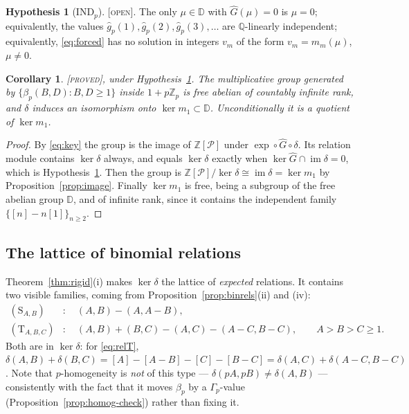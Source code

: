 \documentclass[11pt,reqno]{article}
\newcommand{\Zp}{\mathbb{Z}_p}
\newcommand{\QQ}{\mathbb{Q}}
\newcommand{\ZZ}{\mathbb{Z}}
\newcommand{\Gp}{\Gamma_p}
\newcommand{\gh}{\widehat{g}_p}
\newcommand{\bet}{\beta_p}
\newcommand{\Pset}{\mathcal{P}}
\newcommand{\Div}{\mathbb{D}}
\DeclareMathOperator{\im}{im}
\newcommand{\PROVED}{{\normalfont\textsc{[proved]}}}
\newcommand{\OPENTAG}{{\normalfont\textsc{[open]}}}
\theoremstyle{plain}
\newtheorem{corollary}[theorem]{Corollary}
\theoremstyle{definition}
\newtheorem{hypothesis}[theorem]{Hypothesis}
\theoremstyle{remark}
\numberwithin{equation}{section}
\begin{document}
\begin{hypothesis}[$\mathrm{IND}_p$]\label{hyp:ind}
\OPENTAG.  The only $\mu\in\Div$ with $\widehat G(\mu)=0$ is $\mu=0$;
equivalently, the values $\gh(1),\gh(2),\gh(3),\dots$ are $\QQ$-linearly
independent; equivalently, \eqref{eq:forced} has no solution in integers $v_m$
of the form $v_m=m_m(\mu)$, $\mu\ne0$.
\end{hypothesis}

\begin{corollary}\label{cor:free}
\PROVED, under Hypothesis~\ref{hyp:ind}.  The multiplicative group generated by
$\{\bet(B,D):B,D\ge1\}$ inside $1+p\Zp$ is free abelian of countably infinite
rank, and $\delta$ induces an isomorphism onto $\ker m_1\subset\Div$.
Unconditionally it is a quotient of $\ker m_1$.
\end{corollary}

\begin{proof}
By \eqref{eq:key} the group is the image of $\ZZ[\Pset]$ under
$\exp\circ\widehat G\circ\delta$.  Its relation module contains $\ker\delta$
always, and equals $\ker\delta$ exactly when $\ker\widehat G\cap\im\delta=0$,
which is Hypothesis~\ref{hyp:ind}.  Then the group is
$\ZZ[\Pset]/\ker\delta\cong\im\delta=\ker m_1$ by
Proposition~\ref{prop:image}.  Finally $\ker m_1$ is free, being a subgroup of
the free abelian group $\Div$, and of infinite rank, since it contains the
independent family $\{[n]-n[1]\}_{n\ge2}$.
\end{proof}

\subsection{The lattice of binomial relations}

Theorem~\ref{thm:rigid}(i) makes $\ker\delta$ the lattice of \emph{expected}
relations.  It contains two visible families, coming from
Proposition~\ref{prop:binrels}(ii) and (iv):
\begin{align}
  (\mathrm{S}_{A,B})&:\quad (A,B)-(A,A-B), \label{eq:relS}\\
  (\mathrm{T}_{A,B,C})&:\quad (A,B)+(B,C)-(A,C)-(A-C,B-C),\qquad A>B>C\ge1.
  \label{eq:relT}
\end{align}
Both are in $\ker\delta$: for \eqref{eq:relT},
$\delta(A,B)+\delta(B,C)=[A]-[A-B]-[C]-[B-C]=\delta(A,C)+\delta(A-C,B-C)$.
Note that $p$-homogeneity is \emph{not} of this type --- $\delta(pA,pB)\ne
\delta(A,B)$ --- consistently with the fact that it moves $\bet$ by a
$\Gp$-value (Proposition~\ref{prop:homog-check}) rather than fixing it.
\end{document}
